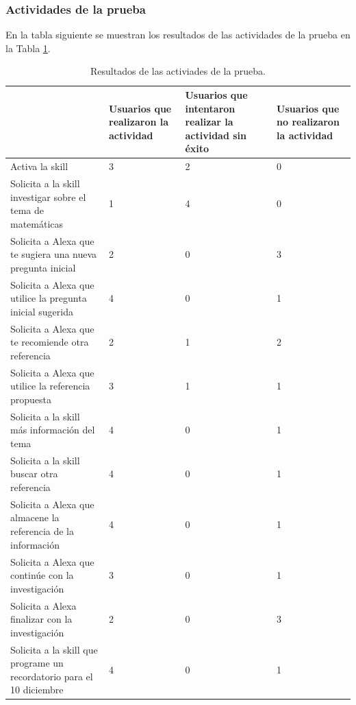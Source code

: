 
\subsubsection{Actividades de la prueba}
\label{ActividadesPruebacapIV}

En la tabla siguiente se muestran los resultados de las actividades de la prueba en la Tabla \ref{tab:t43}.

\begin{table}[H]
  \begin{center}
    \begin{tabular}{ | p{7cm} | p{3cm} | p{3cm} | p{3cm} | }
      \hline
       & Usuarios que realizaron la actividad & Usuarios que intentaron realizar la actividad sin éxito & Usuarios que no realizaron la actividad \\ \hline
      Activa la skill & 3 & 2 & 0 \\ \hline
      Solicita a la skill investigar sobre el tema de matemáticas & 1 & 4 & 0 \\ \hline
      Solicita a Alexa que te sugiera una nueva pregunta inicial & 2 & 0 & 3 \\ \hline
      Solicita a Alexa que utilice la pregunta inicial sugerida & 4 & 0 & 1 \\ \hline
      Solicita a Alexa que te recomiende otra referencia & 2 & 1 & 2 \\ \hline
      Solicita a Alexa que utilice la referencia propuesta & 3 & 1 & 1 \\ \hline
      Solicita a la skill más información del tema & 4 & 0 & 1 \\ \hline
      Solicita a la skill buscar otra referencia & 4 & 0 & 1 \\ \hline
      Solicita a Alexa que almacene la referencia de la información & 4 & 0 & 1 \\ \hline
      Solicita a Alexa que continúe con la investigación & 3 & 0 & 1 \\ \hline
      Solicita a Alexa finalizar con la investigación & 2 & 0 & 3 \\ \hline
      Solicita a la skill que programe un recordatorio para el 10 diciembre & 4 & 0 & 1 \\ \hline
    \end{tabular}
    \caption{Resultados de las activiades de la prueba.}
    \label{tab:t43}
  \end{center}
\end{table}

